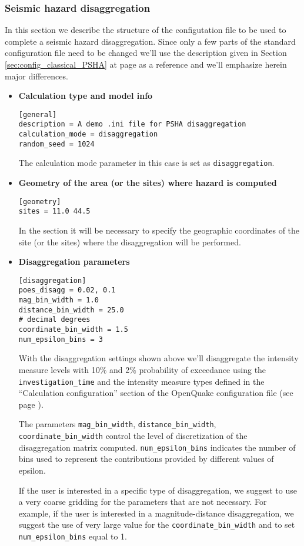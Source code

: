 \subsubsection{Seismic hazard disaggregation}
\label{sec:disaggregation}
%
In this section we describe the structure of the configutation 
file to be used to complete a seismic hazard disaggregation. 
Since only a few parts of the standard configuration file need to 
be changed we'll use the description given in Section 
\ref{sec:config_classical_PSHA} at page 
\pageref{sec:config_classical_PSHA} as a reference and we'll 
emphasize herein major differences.
%
\begin{itemize}
%
\item \textbf{Calculation type and model info}
\begin{Verbatim}[frame=single, commandchars=\\\{\}, fontsize=\small]
[general]
description = A demo .ini file for PSHA disaggregation
calculation_mode = disaggregation
random_seed = 1024
\end{Verbatim}
The calculation mode parameter in this case is set as 
\texttt{disaggregation}.
%
\item \textbf{Geometry of the area (or the sites) where hazard is computed}
\begin{Verbatim}[frame=single, commandchars=\\\{\}, fontsize=\small]
[geometry]
sites = 11.0 44.5
\end{Verbatim}

In the section it will be necessary to specify the geographic 
coordinates of the site (or the sites) where the disaggregation
will be performed.
%
\item \textbf{Disaggregation parameters}
\begin{Verbatim}[frame=single, commandchars=\\\{\}, fontsize=\small]
[disaggregation]
poes_disagg = 0.02, 0.1
mag_bin_width = 1.0
distance_bin_width = 25.0
# decimal degrees
coordinate_bin_width = 1.5
num_epsilon_bins = 3
\end{Verbatim}
With the disaggregation settings shown above we'll disaggregate the intensity
measure levels with 10\% and 2\% probability of exceedance using the
\texttt{in\-ves\-ti\-gation\_time} and the intensity measure types 
defined in the ``Calculation configuration'' section of the OpenQuake
configuration file (see page \pageref{sec:calculation_configuration}). 

The parameters \texttt{mag\_bin\_width},  \texttt{distance\_bin\_width},
\texttt{coordinate\_bin\_width} control the level of discretization of the
disaggregation matrix computed. \texttt{num\_epsilon\_bins} indicates the 
number of bins used to represent the contributions provided by different
values of epsilon.

If the user is interested in a specific type of disaggregation,
we suggest to use a very coarse gridding for the parameters that are 
not necessary. For example, if the user is interested in a magnitude-distance 
disaggregation, we suggest the use of very large value for the 
\texttt{coordinate\_\-bin\_\-width} and to set  \texttt{num\_epsilon\_bins}
equal to 1.
\end{itemize}
